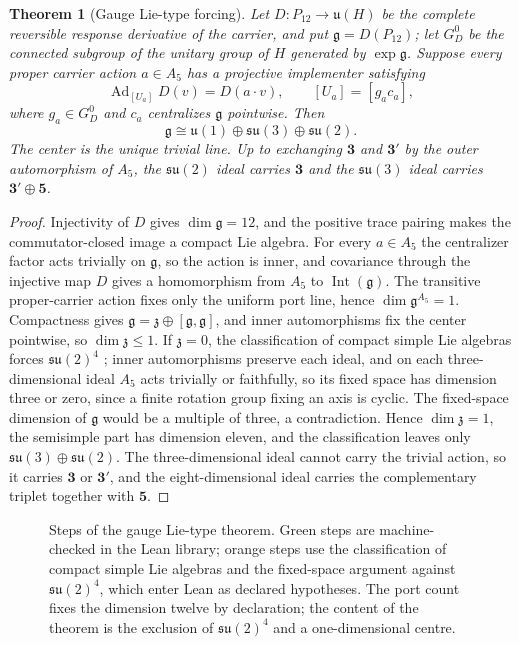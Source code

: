 \documentclass[11pt]{article}
\newtheorem{theorem}{Theorem}[section]
\theoremstyle{definition}
\theoremstyle{remark}
\begin{document}
\begin{theorem}[Gauge Lie-type forcing]
\label{thm:inner-action-closure}
Let $D:P_{12}\to\mathfrak u(H)$ be the complete reversible response derivative
of the carrier, and put $\mathfrak g=D(P_{12})$; let $G_D^0$ be the connected subgroup of the unitary group of $H$ generated by $\exp\mathfrak g$. Suppose every proper carrier
action $a\in A_5$ has a projective implementer satisfying
\[
\operatorname{Ad}_{[U_a]}D(v)=D(a\!\cdot\!v),
\qquad
[U_a]=[g_ac_a],
\]
where $g_a\in G_D^0$ and $c_a$ centralizes $\mathfrak g$ pointwise. Then
\[
\mathfrak g\cong
\mathfrak u(1)\oplus\mathfrak{su}(3)\oplus\mathfrak{su}(2).
\]
The center is the unique trivial line. Up to exchanging
$\mathbf3$ and $\mathbf3'$ by the outer automorphism of $A_5$, the
$\mathfrak{su}(2)$ ideal carries $\mathbf3$ and the $\mathfrak{su}(3)$ ideal
carries $\mathbf3'\oplus\mathbf5$.
\end{theorem}

\begin{proof}
Injectivity of $D$ gives $\dim\mathfrak g=12$, and the positive trace pairing
makes the commutator-closed image a compact Lie algebra. For every
$a\in A_5$ the centralizer factor acts trivially on $\mathfrak g$, so the
action is inner, and covariance through the injective map $D$ gives a
homomorphism from $A_5$ to $\operatorname{Int}(\mathfrak g)$. The transitive
proper-carrier action fixes only the uniform port line, hence
$\dim\mathfrak g^{A_5}=1$. Compactness gives
$\mathfrak g=\mathfrak z\oplus[\mathfrak g,\mathfrak g]$, and inner
automorphisms fix the center pointwise, so $\dim\mathfrak z\leq1$. If
$\mathfrak z=0$, the classification of compact simple Lie algebras forces
$\mathfrak{su}(2)^4$ \cite{hall2015}; inner automorphisms preserve each
ideal, and on each three-dimensional ideal $A_5$ acts trivially or
faithfully, so its fixed space has dimension three or zero, since a finite
rotation group fixing an axis is cyclic. The fixed-space dimension of
$\mathfrak g$ would be a multiple of three, a contradiction. Hence
$\dim\mathfrak z=1$, the semisimple part has dimension eleven, and the
classification leaves only $\mathfrak{su}(3)\oplus\mathfrak{su}(2)$. The
three-dimensional ideal cannot carry the trivial action, so it carries
$\mathbf3$ or $\mathbf3'$, and the eight-dimensional ideal carries the
complementary triplet together with $\mathbf5$.
\end{proof}

\begin{figure}[!htb]
\centering

\caption{Steps of the gauge Lie-type theorem. Green steps are machine-checked in the Lean library; orange steps use the classification of compact simple Lie algebras and the fixed-space argument against $\mathfrak{su}(2)^4$, which enter Lean as declared hypotheses. The port count fixes the dimension twelve by declaration; the content of the theorem is the exclusion of $\mathfrak{su}(2)^4$ and a one-dimensional centre.}
\label{fig:gauge-lie-type}
\end{figure}
\end{document}
